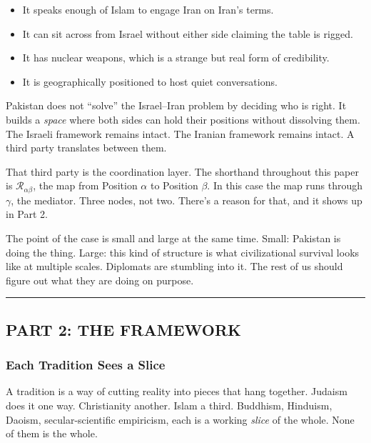 \documentclass[
]{article}
\providecommand{\tightlist}{%
  \setlength{\itemsep}{0pt}\setlength{\parskip}{0pt}}
\begin{document}
\begin{itemize}
\tightlist
\item
  It speaks enough of Islam to engage Iran on Iran's terms.
\item
  It can sit across from Israel without either side claiming the table
  is rigged.
\item
  It has nuclear weapons, which is a strange but real form of
  credibility.
\item
  It is geographically positioned to host quiet conversations.
\end{itemize}

Pakistan does not ``solve'' the Israel--Iran problem by deciding who is
right. It builds a \emph{space} where both sides can hold their
positions without dissolving them. The Israeli framework remains intact.
The Iranian framework remains intact. A third party translates between
them.

That third party is the coordination layer. The shorthand throughout
this paper is \(\mathcal{R}_{\alpha\beta}\), the map from Position \(\alpha\) to
Position \(\beta\). In this case the map runs through \(\gamma\), the mediator. Three
nodes, not two. There's a reason for that, and it shows up in Part 2.

The point of the case is small and large at the same time. Small:
Pakistan is doing the thing. Large: this kind of structure is what
civilizational survival looks like at multiple scales. Diplomats are
stumbling into it. The rest of us should figure out what they are doing
on purpose.

\begin{center}\rule{0.5\linewidth}{0.5pt}\end{center}

\subsection{PART 2: THE FRAMEWORK}\label{part-2-the-framework}

\subsubsection{Each Tradition Sees a
Slice}\label{each-tradition-sees-a-slice}

A tradition is a way of cutting reality into pieces that hang together.
Judaism does it one way. Christianity another. Islam a third. Buddhism,
Hinduism, Daoism, secular-scientific empiricism, each is a working
\emph{slice} of the whole. None of them is the whole.
\end{document}
